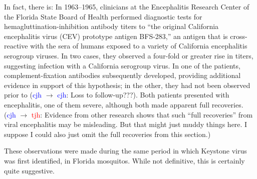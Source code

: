 \documentclass[12pt]{article}
\newcommand{\cjh}{\textcolor{blue}{cjh}}
\newcommand{\tjh}{\textcolor{red}{tjh}}
\newcommand{\msg}[3]{(#1 $\rightarrow$ #2: #3)}
\newcommand{\mcc}[1]{\msg\cjh\cjh{#1}}
\newcommand{\mct}[1]{\msg\cjh\tjh{#1}}
\begin{document}
        In fact, there is: In 1963--1965, clinicians at the Encephalitis Research Center of the Florida State Board of Health performed diagnostic tests for hemagluttination-inhibition antibody titers to ``the original California encephalitis virus (CEV) prototype antigen BFS-283,'' an antigen that is cross-reactive with the sera of humans exposed to a variety of California encephalitis serogroup viruses. In two cases, they observed a four-fold or greater rise in titers, suggesting infection with a California serogroup virus. In one of the patients, complement-fixation antibodies subsequently developed, providing additional evidence in support of this hypothesis; in the other, they had not been observed prior to \mcc{Loss to follow-up???}. Both patients presented with encephalitis, one of them severe, although both made apparent full recoveries.\cite{bond1966california} \mct{Evidence from other research shows that such ``full recoveries'' from viral encephalitis may be misleading. But that might just muddy things here. I suppose I could also just omit the full recoveries from this section.}

    These observations were made during the same period in which Keystone virus was first identified, in Florida mosquitos.\cite{bond1966california} While not definitive, this is certainly quite suggestive. %
    
\end{document}
